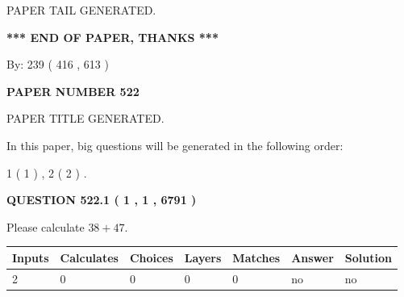 \documentclass[12pt]{article}
\begin{document}
   
   
\vspace{2.0in} PAPER TAIL GENERATED.
   
   
   
   
\vspace{1.0in} 
{\textbf{\large{ *** END OF PAPER, THANKS *** }}} 
   
   
\hspace{1.0in} By: 
 239 ( 416 ,  613 )
   
   
   
   
\newpage 
\setcounter{page}{ 
   522001 } 
   
   
   
   
 {\textbf{ \Large{ PAPER NUMBER  522  }}}
   
   
\vspace{0.2in}
   
   
   
   
   
   
   
   
 \vspace{0.2in}
 
 
 
 
   
   
 PAPER TITLE GENERATED.
   
   
   
\vspace{0.2in}
   
In this paper, big questions will be generated in the following order: 
   
   
   1 ( 1 )
 ,
   2 ( 2 )
 .
  
\vspace{0.2in}
  
{\textbf{\Large{QUESTION
522.1 
 ( 1 , 1 , 6791 )
}}}
  
  
 
Please calculate $ %
38 +  %
47 $.
 
 
   
   
   
   
\noindent\begin{tabular}{|l|l|l|l|l|l|l|}
 \hline
Inputs & Calculates & Choices & Layers & Matches & Answer & Solution \\ \hline
 2  & 
 0  & 
 0
  & 
 0  & 
 0  & 
  no & 
  no 
  \\ \hline
 \end{tabular}
   
\end{document}

